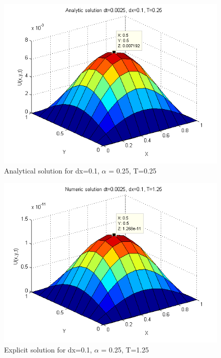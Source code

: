 \documentclass[a4paper,10pt]{article}
\begin{document}
\begin{figure}
  \begin{center}
    \includegraphics[scale=0.5]{ana_dt00025_dx01_T025}
    \caption{Analytical solution for dx=0.1, $\alpha$ = 0.25, T=0.25}
    \label{fig:Ana_dx0.1_dt0.0025T1}
  \end{center}
\end{figure}

\begin{figure}
  \begin{center}
    \includegraphics[scale=0.5]{num_dt00025_dx01_T125}
    \caption{Explicit solution for dx=0.1, $\alpha$ = 0.25, T=1.25}
    \label{fig:Num_dx0.1_dt0.0025T2}
  \end{center}
\end{figure}
\end{document}
